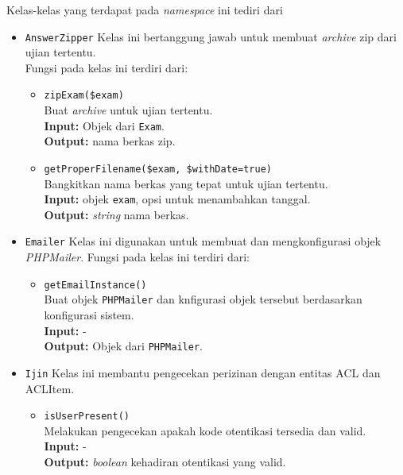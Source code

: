     Kelas-kelas yang terdapat pada \textit{namespace} ini tediri dari
    \begin{itemize}
        \item \texttt{AnswerZipper} Kelas ini bertanggung jawab untuk membuat
            \textit{archive} zip dari ujian tertentu.\\
            Fungsi pada kelas ini terdiri dari:
            \begin{itemize}
                \item \texttt{zipExam(\$exam)} \\
                    Buat \textit{archive} untuk ujian tertentu. \\
                    \textbf{Input:} Objek dari \texttt{Exam}.\\
                    \textbf{Output:} nama berkas zip.
                    
                \item \texttt{getProperFilename(\$exam, \$withDate=true)} \\
                    Bangkitkan nama berkas yang tepat untuk ujian tertentu.\\
                    \textbf{Input:} objek \texttt{exam}, opsi untuk menambahkan
                    tanggal.\\
                    \textbf{Output:} \textit{string} nama berkas.
            \end{itemize}
        
        \item \texttt{Emailer} Kelas ini digunakan untuk membuat dan
            mengkonfigurasi objek \textit{PHPMailer}. Fungsi pada kelas ini
            terdiri dari:
            \begin{itemize}
                \item \texttt{getEmailInstance()} \\
                    Buat objek \texttt{PHPMailer} dan knfigurasi objek tersebut
                    berdasarkan konfigurasi sistem.\\
                    \textbf{Input:} -\\
                    \textbf{Output:} Objek dari \texttt{PHPMailer}.
            \end{itemize}
            
        \item \texttt{Ijin} Kelas ini membantu pengecekan perizinan dengan
            entitas ACL dan ACLItem.
            \begin{itemize}
                \item \texttt{isUserPresent()} \\
                    Melakukan pengecekan apakah kode otentikasi tersedia dan
                    valid. \\
                    \textbf{Input:} -\\
                    \textbf{Output:} \textit{boolean} kehadiran otentikasi yang
                    valid.
                    

\end{itemize}
\end{itemize}
